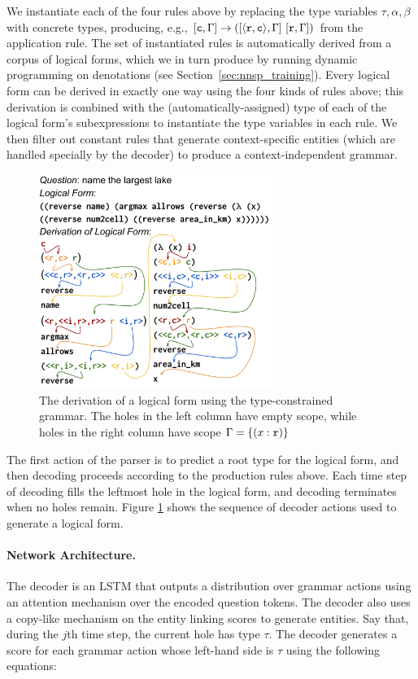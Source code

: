 We instantiate each of the four rules above by replacing the type variables 
$\tau, \alpha,\beta$ with concrete types, producing, e.g., $[\mathtt{c},\Gamma] 
\rightarrow ([\mathtt{\langle \mathtt{r},\mathtt{c} \rangle},\Gamma]~[\mathtt{r},\Gamma])$ from the application 
rule.
The set of instantiated rules is automatically derived from a corpus of logical 
forms, which we in turn produce by running dynamic programming on denotations 
(see Section~\ref{sec:nnsp_training}).
Every logical form can be derived in exactly one way using the four kinds of 
rules above; this derivation is combined with the (automatically-assigned) type 
of each of the logical form's subexpressions to instantiate the type variables 
in each rule.
We then filter out constant rules that generate context-specific entities 
(which are 
handled specially by the decoder) to produce a 
context-independent grammar.

\begin{figure}
\centering
\includegraphics[width=3in]{figures/nnsp_example_derivation.png}
\caption{The derivation of a logical form using the  type-constrained grammar. 
The holes in the left column have 
empty scope, while holes in the right column have scope $\Gamma = \{(x : 
\mathtt{r})\}$}
\label{fig:grammar_derivation}
\end{figure}

The first action of the parser is to predict a root type for the logical form, 
and then decoding proceeds according to the production rules above.
Each time step of decoding fills the leftmost hole in the logical form, and 
decoding terminates when no holes remain.
Figure \ref{fig:grammar_derivation} shows the sequence of decoder actions used 
to generate a logical form.

\paragraph{Network Architecture.} The decoder is an LSTM that outputs a 
distribution over grammar actions using an attention mechanism over the encoded 
question tokens. The decoder also uses a copy-like mechanism on the entity 
linking scores to generate entities.
Say that, during the $j$th time step, the current hole has type $\tau$. The 
decoder generates a score for each grammar action whose left-hand side is 
$\tau$ using the following equations:

